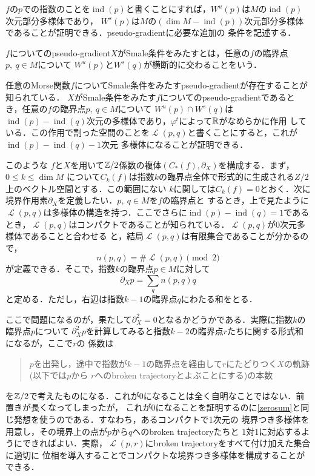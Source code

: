 \documentclass[dvipdfmx,uplatex]{jsarticle}
\DeclareMathOperator{\ind}{ind}
\begin{document}
$f$の$p$での指数のことを$\ind (p)$と書くことにすれば，$W^u(p)$は$M$の$\ind (p)$次元部分多様体であり，
$W^s(p)$は$M$の$(\dim M-\ind (p))$次元部分多様体であることが証明できる．pseudo-gradientに必要な追加の
条件を記述する．

\begin{definition}
$f$についてのpseudo-gradient$X$がSmale条件をみたすとは，任意の$f$の臨界点$p,\ q\in M$について
$W^u(p)とW^s(q)$が横断的に交わることをいう．
\end{definition}

任意のMorse関数$f$についてSmale条件をみたすpseudo-gradientが存在することが知られている．
$X$がSmale条件をみたす$f$についてのpseudo-gradientであるとき，任意の$f$の臨界点$p,\ q\in M$について
$W^u(p)\cap W^s(q)$は$\ind(p)-\ind(q)$次元の多様体であり，$\varphi^t$によって$\mathbb{R}$がなめらかに作用
している．この作用で割った空間のことを$\mscrL(p,q)$と書くことにすると，これが$\ind(p)-\ind(q)-1$次元
多様体になることが証明できる．

このような
$f$と$X$を用いて$\mathbb{Z}/2$係数の複体$(C_\ast(f),\partial_X)$を構成する．まず，$0\leq k\leq \dim M$
について$C_k(f)$は指数$k$の臨界点全体で形式的に生成される$Z/2$上のベクトル空間とする．この範囲にない
$k$に関しては$C_k(f)=0$とおく．次に境界作用素$\partial_X$を定義したい．$p,\ q\in M$を$f$の臨界点と
するとき，上で見たように$\mscrL(p,q)$は多様体の構造を持つ．ここでさらに$\ind (p)-\ind (q)=1$である
とき，$\mscrL(p,q)$はコンパクトであることが知られている．$\mscrL(p,q)$が0次元多様体であることと合わせる
と，結局$\mscrL(p,q)$は有限集合であることが分かるので，
\[ n(p,q) = \# \mscrL(p,q) \pmod 2 \]
が定義できる．そこで，指数$k$の臨界点$p\in M$に対して
\[ \partial_X p = \sum_q n(p,q)q \]
と定める．ただし，右辺は指数$k-1$の臨界点$q$にわたる和をとる．

ここで問題になるのが，果たして$\partial_X^2=0$となるかどうかである．実際に指数$k$の臨界点$p$について
$\partial_X^2p$を計算してみると指数$k-2$の臨界点$r$たちに関する形式和になるが，ここで$r$の
係数は
\begin{quote}
    $p$を出発し，途中で指数が$k-1$の臨界点を経由して$r$にたどりつく$X$の軌跡(以下では$p$から
    $r$へのbroken trajectoryとよぶことにする)の本数
\end{quote}
を$\mathbb{Z}/2$で考えたものになる．これが0になることは全く自明なことではない．前置きが長くなってしまったが，
これが0になることを証明するのに\cref{zerosum}と同じ発想を使うのである．すなわち，あるコンパクトで1次元の
境界つき多様体を用意し，その境界上の点が$p$から$q$へのbroken trajectoryたちと
1対1に対応するようにできればよい．実際，$\mscrL(p,r)$にbroken trajectoryをすべて付け加えた集合に適切に
位相を導入することでコンパクトな境界つき多様体を構成することができる．
\end{document}
